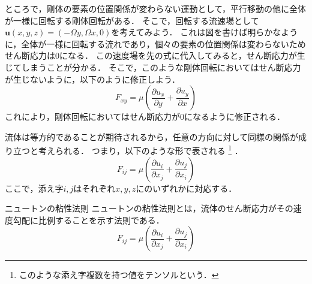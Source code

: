 \documentclass[uplatex,dvipdfmx,a4j,11pt]{jsreport}
\numberwithin{equation}{chapter}
\begin{document}
ところで，剛体の要素の位置関係が変わらない運動として，平行移動の他に全体が一様に回転する剛体回転がある．
そこで，回転する流速場として$\mathbf{u}(x, y, z) = (-\Omega y, \Omega x, 0)$を考えてみよう．
これは図を書けば明らかなように，全体が一様に回転する流れであり，個々の要素の位置関係は変わらないためせん断応力は$0$になる．
この速度場を先の式に代入してみると，せん断応力が生じてしまうことが分かる．
そこで，このような剛体回転においてはせん断応力が生じないように，以下のように修正しよう．
\begin{equation*}
  F_{xy} = \mu \left(\frac{\partial u_x}{\partial y} + \frac{\partial u_y}{\partial x}\right)
\end{equation*}
これにより，剛体回転においてはせん断応力が$0$になるように修正される．

流体は等方的であることが期待されるから，任意の方向に対して同様の関係が成り立つと考えられる．
つまり，以下のような形で表される
\footnote{このような添え字複数を持つ値をテンソルという．}
．
\begin{equation*}
  F_{ij} = \mu\left(\frac{\partial u_i}{\partial x_j} + \frac{\partial u_j}{\partial x_i}\right)
\end{equation*}
ここで，添え字$i, j$はそれぞれ$x, y, z$にのいずれかに対応する．


\begin{definition}{ニュートンの粘性法則}{}{}
  ニュートンの粘性法則とは，流体のせん断応力がその速度勾配に比例することを示す法則である．
  \begin{equation}
    F_{ij} = \mu\left(\frac{\partial u_i}{\partial x_j} + \frac{\partial u_j}{\partial x_i}\right)
  \end{equation}
\end{definition}

\enskip
\end{document}
